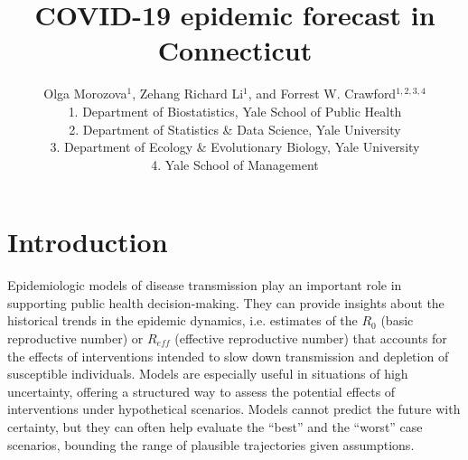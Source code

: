 \documentclass[11pt]{article}
\title{COVID-19 epidemic forecast in Connecticut}
\author{Olga Morozova$^{1}$,
  Zehang Richard Li$^1$,
and Forrest W. Crawford$^{1,2,3,4}$  \\[1em]
\small 1. Department of Biostatistics, Yale School of Public Health \\
\small 2. Department of Statistics \& Data Science, Yale University \\
\small 3. Department of Ecology \& Evolutionary Biology, Yale University \\
\small 4. Yale School of Management }
\newcommand{\comments}[1]{[\textcolor{red}{#1}]}
\begin{document}
\maketitle




\section{Introduction}




Epidemiologic models of disease transmission play an important role in supporting public health decision-making. They can provide insights about the historical trends in the epidemic dynamics, i.e. estimates of the $R_0$ (basic reproductive number) or $R_{eff}$ (effective reproductive number) that accounts for the effects of interventions intended to slow down transmission and depletion of susceptible individuals.
Models are especially useful in situations of high uncertainty, offering a structured way to assess the potential effects of interventions under hypothetical scenarios. Models cannot predict the future with certainty, but they can often help evaluate the ``best'' and the ``worst'' case scenarios, bounding the range of plausible trajectories given assumptions. 
\end{document}
